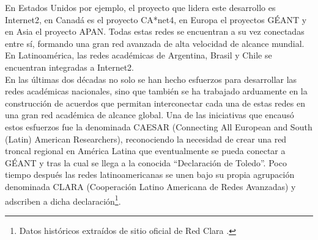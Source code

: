 En Estados Unidos por ejemplo, el proyecto que lidera este desarrollo es Internet2\citep{Internet2}, en Canadá es el proyecto CA*net4\citep{Canarie2}, en Europa el proyectos GÉANT\citep{GEANT} y en Asia el proyecto APAN\citep{APAN}. Todas estas redes se encuentran a su vez conectadas entre sí, formando una gran red avanzada de alta velocidad de alcance mundial. En Latinoamérica, las redes académicas de Argentina, Brasil y Chile se encuentran integradas a Internet2.\\

En las \'ultimas dos d\'ecadas no solo se han hecho esfuerzos para desarrollar las redes académicas nacionales, sino que también se ha trabajado arduamente en la construcción de acuerdos que permitan interconectar cada una de estas redes en una gran red académica de alcance global. Una de las iniciativas que encaus\'o estos esfuerzos fue la denominada CAESAR (Connecting All European and South (Latin) American Researchers), reconociendo la necesidad de crear una red troncal regional en América Latina que eventualmente se pueda conectar a GÉANT y tras la cual se llega a la conocida “Declaración de Toledo”. Poco tiempo después las redes latinoamericanas se unen bajo su propia agrupación denominada CLARA (Cooperación Latino Americana de Redes Avanzadas) y adscriben a dicha declaración\footnote{Datos históricos extraídos de sitio oficial de Red Clara \cite{RedClara}.}.\\




